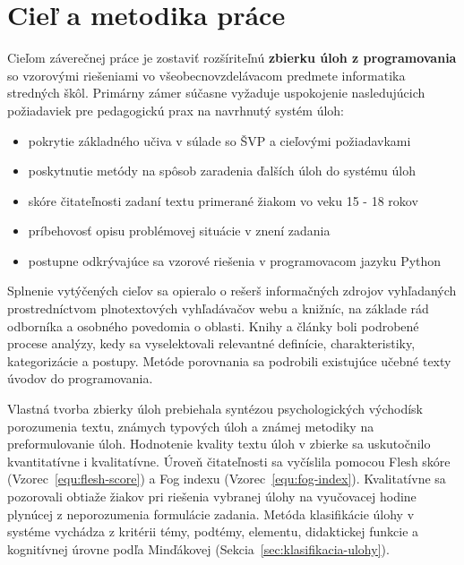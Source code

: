 \chapter{Cieľ a metodika práce}
Cieľom záverečnej práce je zostaviť rozšíriteľnú \textbf{zbierku úloh z programovania} so vzorovými riešeniami vo všeobecnovzdelávacom predmete informatika stredných škôl. Primárny zámer súčasne vyžaduje uspokojenie nasledujúcich požiadaviek pre pedagogickú prax na navrhnutý systém úloh:

\begin{itemize}[noitemsep]
\item pokrytie základného učiva v súlade so ŠVP a cieľovými požiadavkami 
\item poskytnutie metódy na spôsob zaradenia ďalších úloh do systému úloh
\item skóre čitateľnosti zadaní textu primerané žiakom vo veku 15 - 18 rokov
\item príbehovosť opisu problémovej situácie v znení zadania
\item postupne odkrývajúce sa vzorové riešenia v programovacom jazyku Python
\end{itemize}

Splnenie vytýčených cieľov sa opieralo o rešerš informačných zdrojov vyhľadaných prostredníctvom plnotextových vyhľadávačov webu a knižníc, na základe rád odborníka a osobného povedomia o oblasti. Knihy a články boli podrobené procese analýzy, kedy sa vyselektovali relevantné definície, charakteristiky, kategorizácie a postupy. Metóde porovnania sa podrobili existujúce učebné texty úvodov do programovania. 

Vlastná tvorba zbierky úloh prebiehala syntézou psychologických východísk porozumenia textu, známych typových úloh a známej metodiky na preformulovanie úloh. Hodnotenie kvality textu úloh v zbierke sa uskutočnilo kvantitatívne i kvalitatívne. Úroveň čitateľnosti sa vyčíslila pomocou Flesh skóre (Vzorec~\ref{equ:flesh-score}) a Fog indexu (Vzorec~\ref{equ:fog-index}). Kvalitatívne sa pozorovali obtiaže žiakov pri riešenia vybranej úlohy na vyučovacej hodine plynúcej z neporozumenia formulácie zadania. Metóda klasifikácie úlohy v systéme vychádza z kritérii témy, podtémy, elementu, didaktickej funkcie a kognitívnej úrovne podľa Minďákovej (Sekcia~\ref{sec:klasifikacia-ulohy}).
